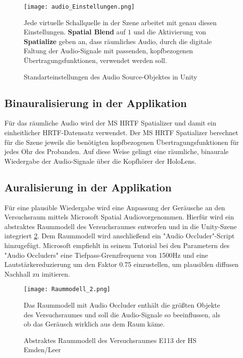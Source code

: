  
  \begin{figure}[H]
\centering
\texttt{[image: audio\_Einstellungen.png]}
\caption{Standarteinstellungen des \glqq Audio Source\grqq-Objektes in Unity}
Jede virtuelle Schallquelle in der Szene arbeitet mit genau diesen Einstellungen. \textbf{Spatial Blend} auf $1$ und die Aktivierung von \textbf{Spatialize} geben an, dass räumliches Audio, durch die digitale Faltung der Audio-Signale mit passenden, kopfbezogenen Übertragungsfunktionen, verwendet werden soll. 
\label{fig:audio_einstellungen}
\end{figure} 



\subsection{Binauralisierung in der Applikation}
   
Für das räumliche Audio wird der MS HRTF Spatializer und damit ein einheitlicher HRTF-Datensatz verwendet. Der MS HRTF Spatializer berechnet für die Szene jeweils die benötigten kopfbezogenen Übertragungsfunktionen für jedes Ohr des Probanden. Auf diese Weise gelingt eine räumliche, binaurale Wiedergabe der Audio-Signale über die Kopfhörer der HoloLens. 

\subsection{Auralisierung in der Applikation}

Für eine plausible Wiedergabe wird eine Anpassung der Geräusche an den Versuchsraum mittels Microsoft \glqq Spatial Audio\grqq vorgenommen. Hierfür wird ein abstraktes Raummodell des Versuchsraumes entworfen und in die Unity-Szene integriert \ref{fig:Raummodell}. Dem Raummodell wird anschließend ein "Audio Occluder"-Script hinzugefügt. Microsoft empfiehlt in seinem Tutorial bei den Parametern des "Audio Occluders" eine Tiefpass-Grenzfrequenz von 1500Hz und eine Lautstärkereduzierung um den Faktor 0.75 einzustellen, um plausiblen diffusen Nachhall zu imitieren\cite{MSSpatialAudio}.
 
  \begin{figure}[H]
\centering
\texttt{[image: Raummodell\_2.png]}
\caption{Abstraktes Raummodell des Versuchsraumes E113 der HS Emden/Leer}
Das Raummodell mit Audio Occluder enthält die größten Objekte des Versuchsraumes und soll die Audio-Signale so beeinflussen, als ob das Geräusch wirklich aus dem Raum käme.
\label{fig:Raummodell}
\end{figure} 

